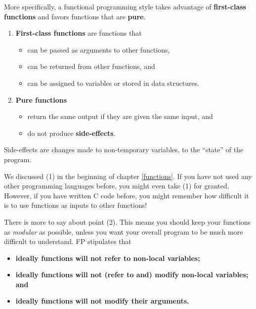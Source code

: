 \documentclass[
  12pt,
  krantz2]{krantz}
\providecommand{\tightlist}{%
  \setlength{\itemsep}{0pt}\setlength{\parskip}{0pt}}
\begin{document}
More specifically, a functional programming style takes advantage of \textbf{first-class functions} and favors functions that are \textbf{pure}.

\begin{enumerate}
\def\labelenumi{\arabic{enumi}.}
\tightlist
\item
  \textbf{First-class functions} are \citep{struc_and_interp} functions that

  \begin{itemize}
  \tightlist
  \item
    can be passed as arguments to other functions,
  \item
    can be returned from other functions, and
  \item
    can be assigned to variables or stored in data structures.
  \end{itemize}
\item
  \textbf{Pure functions}

  \begin{itemize}
  \tightlist
  \item
    return the same output if they are given the same input, and
  \item
    do not produce \textbf{side-effects}.
  \end{itemize}
\end{enumerate}

Side-effects are changes made to non-temporary variables, to the ``state'' of the program.

We discussed (1) in the beginning of chapter \ref{functions}. If you have not used any other programming languages before, you might even take (1) for granted. However, if you have written C code before, you might remember how difficult it is to use functions as inputs to other functions!

There is more to say about point (2). This means you should keep your functions as \emph{modular} as possible, unless you want your overall program to be much more difficult to understand. FP stipulates that

\begin{itemize}
\item
  \textbf{ideally functions will not refer to non-local variables;}
\item
  \textbf{ideally functions will not (refer to and) modify non-local variables; and}
\item
  \textbf{ideally functions will not modify their arguments.}
\end{itemize}
\end{document}
